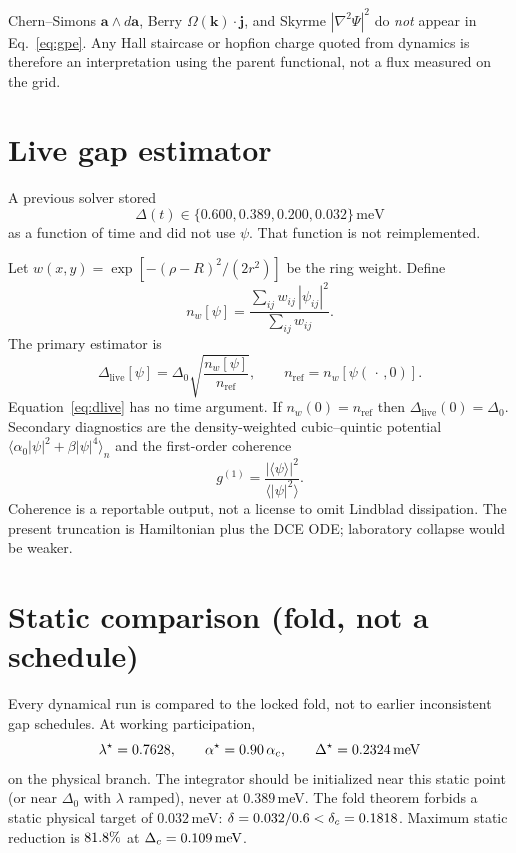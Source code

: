 \documentclass[11pt,letterpaper]{article}
\begin{document}
Chern--Simons $\mathbf{a}\wedge d\mathbf{a}$, Berry $\Omega(\mathbf{k})\cdot\mathbf{j}$, and Skyrme $|\nabla^2\Psi|^2$ do \emph{not} appear in Eq.~\eqref{eq:gpe}. Any Hall staircase or hopfion charge quoted from dynamics is therefore an interpretation using the parent functional, not a flux measured on the grid.

\section{Live gap estimator}
\label{sec:live}

A previous solver stored
\begin{equation}
\Delta(t)\in\{0.600,0.389,0.200,0.032\}\,\mathrm{meV}
\end{equation}
as a function of time and did not use $\psi$. That function is not reimplemented.

Let $w(x,y)=\exp[-(\rho-R)^2/(2r^2)]$ be the ring weight. Define
\begin{equation}
n_w[\psi]=\frac{\sum_{ij} w_{ij}\,|\psi_{ij}|^2}{\sum_{ij} w_{ij}}.
\end{equation}
The primary estimator is
\begin{equation}
\Delta_{\mathrm{live}}[\psi]=\Delta_0\sqrt{\frac{n_w[\psi]}{n_{\mathrm{ref}}}},\qquad n_{\mathrm{ref}}=n_w[\psi(\,\cdot\,,0)].
\label{eq:dlive}
\end{equation}
Equation~\eqref{eq:dlive} has no time argument. If $n_w(0)=n_{\mathrm{ref}}$ then $\Delta_{\mathrm{live}}(0)=\Delta_0$. Secondary diagnostics are the density-weighted cubic--quintic potential $\langle\alpha_0|\psi|^2+\beta|\psi|^4\rangle_n$ and the first-order coherence
\begin{equation}
g^{(1)}=\frac{|\langle\psi\rangle|^2}{\langle|\psi|^2\rangle}.
\end{equation}
Coherence is a reportable output, not a license to omit Lindblad dissipation. The present truncation is Hamiltonian plus the DCE ODE; laboratory collapse would be weaker.

\section{Static comparison (fold, not a schedule)}
\label{sec:static}

Every dynamical run is compared to the locked fold, not to earlier inconsistent gap schedules. At working participation,
\begin{equation}
\lambda^\star=0.7628,\qquad\alpha^\star=0.90\,\alpha_c,\qquad\Delta^\star=0.2324\,\mathrm{meV}
\end{equation}
on the physical branch. The integrator should be initialized near this static point (or near $\Delta_0$ with $\lambda$ ramped), never at $0.389$\,meV. The fold theorem forbids a static physical target of $0.032$\,meV: $\delta=0.032/0.6<\delta_c=0.1818$. Maximum static reduction is $81.8\%$ at $\Delta_c=0.109\,\mathrm{meV}$.
\end{document}
